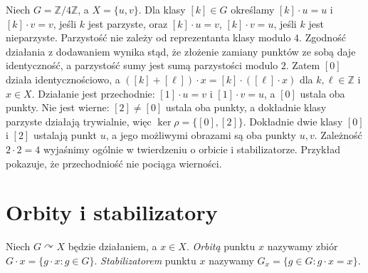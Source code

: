 \begin{przyklad}
\label{aa:prz:akcja-c4-dwa-punkty}
Niech $G=\mathbb Z/4\mathbb Z$, a $X=\{u,v\}$.
Dla klasy $[k]\in G$ określamy $[k]\cdot u=u$ i
$[k]\cdot v=v$, jeśli $k$ jest parzyste, oraz
$[k]\cdot u=v$, $[k]\cdot v=u$, jeśli $k$ jest nieparzyste.
Parzystość nie zależy od reprezentanta klasy modulo $4$.
Zgodność działania z dodawaniem wynika stąd, że złożenie
zamiany punktów ze sobą daje identyczność, a parzystość sumy
jest sumą parzystości modulo $2$.
Zatem $[0]$ działa identycznościowo, a
$([k]+[\ell])\cdot x=[k]\cdot([\ell]\cdot x)$ dla
$k,\ell\in\mathbb Z$ i $x\in X$.
Działanie jest przechodnie: $[1]\cdot u=v$ i $[1]\cdot v=u$,
a $[0]$ ustala oba punkty.
Nie jest wierne: $[2]\ne[0]$ ustala oba punkty,
a dokładnie klasy parzyste działają trywialnie,
więc $\ker\rho=\{[0],[2]\}$.
Dokładnie dwie klasy $[0]$ i $[2]$ ustalają punkt $u$,
a jego możliwymi obrazami są oba punkty $u,v$.
Zależność $2\cdot2=4$ wyjaśnimy ogólnie w twierdzeniu
o orbicie i stabilizatorze. Przykład pokazuje, że
przechodniość nie pociąga wierności.

\begin{center}
\end{center}
\end{przyklad}

\section{Orbity i stabilizatory}
\begin{definicja}
\label{aa:def:orbita-stabilizator}
Niech $G\curvearrowright X$ będzie działaniem, a $x\in X$.
\emph{Orbitą} punktu $x$ nazywamy zbiór
$G\cdot x=\{g\cdot x:g\in G\}$.
\emph{Stabilizatorem} punktu $x$ nazywamy
$G_x=\{g\in G:g\cdot x=x\}$.
\end{definicja}


